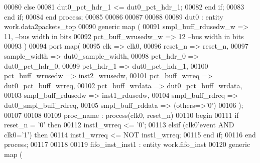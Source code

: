 \begin{DoxyCode}
00080          \textcolor{keywordflow}{else} 
00081             \textcolor{vhdlchar}{dut0_pct_hdr_1} \textcolor{vhdlchar}{<=} \textcolor{vhdlchar}{dut0_pct_hdr_1};
00082          \textcolor{keywordflow}{end} \textcolor{keywordflow}{if};
00083       \textcolor{keywordflow}{end} \textcolor{keywordflow}{if};
00084    \textcolor{keywordflow}{end} \textcolor{keywordflow}{process};
00085    
00086    
00087 
00088   
00089   dut0 : \textcolor{keywordflow}{entity} work.data2packets_top 
00090    \textcolor{keywordflow}{generic} \textcolor{keywordflow}{map} (
00091       smpl_buff_rdusedw_w => \textcolor{vhdllogic}{11},\textcolor{keyword}{ --bus width in bits }
00092       pct_buff_wrusedw_w  => \textcolor{vhdllogic}{12} \textcolor{keyword}{--bus width in bits  }
00093    \textcolor{vhdlchar}{)}
00094    \textcolor{keywordflow}{port} \textcolor{keywordflow}{map}(              
00095       clk               => clk0,
00096       reset_n           => reset_n,
00097       sample_width      => dut0_sample_width,
00098       pct_hdr_0         => dut0_pct_hdr_0,
00099       pct_hdr_1         => dut0_pct_hdr_1,
00100       pct_buff_wrusedw  => inst2_wrusedw,
00101       pct_buff_wrreq    => dut0_pct_buff_wrreq,
00102       pct_buff_wrdata   => dut0_pct_buff_wrdata,
00103       smpl_buff_rdusedw => inst1_rdusedw,
00104       smpl_buff_rdreq   => dut0_smpl_buff_rdreq,
00105       smpl_buff_rddata  => \textcolor{vhdlchar}{(}\textcolor{keywordflow}{others}=>'0'\textcolor{vhdlchar}{)}
00106       \textcolor{vhdlchar}{)};
00107       
00108       
00109  proc\_name : \textcolor{keywordflow}{process}(clk0, reset_n)
00110 \textcolor{vhdlkeyword}{ begin}
00111     \textcolor{keywordflow}{if} \textcolor{vhdlchar}{reset_n} \textcolor{vhdlchar}{=} \textcolor{vhdlchar}{'}\textcolor{vhdllogic}{}\textcolor{vhdllogic}{0}\textcolor{vhdlchar}{'} \textcolor{keywordflow}{then} 
00112        inst1\_wrreq <= '0';
00113     \textcolor{keywordflow}{elsif} \textcolor{vhdlchar}{(}\textcolor{vhdlchar}{clk0}\textcolor{vhdlchar}{'}\textcolor{vhdlkeyword}{event} \textcolor{keywordflow}{AND} \textcolor{vhdlchar}{clk0}\textcolor{vhdlchar}{=}\textcolor{vhdlchar}{'}\textcolor{vhdllogic}{}\textcolor{vhdllogic}{1}\textcolor{vhdlchar}{'}\textcolor{vhdlchar}{)} \textcolor{keywordflow}{then} 
00114        inst1\_wrreq <= \textcolor{keywordflow}{NOT} inst1\_wrreq;
00115     \textcolor{keywordflow}{end} \textcolor{keywordflow}{if};
00116  \textcolor{keywordflow}{end} \textcolor{keywordflow}{process};
00117       
00118       
00119 fifo\_inst\_inst1 : \textcolor{keywordflow}{entity} work.fifo_inst
00120   \textcolor{keywordflow}{generic} \textcolor{keywordflow}{map} (

\end{DoxyCode}
